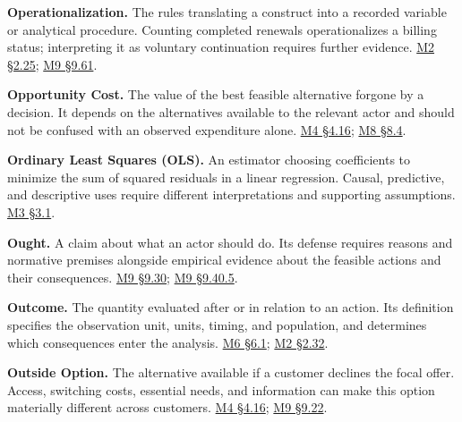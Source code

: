 \noindent\textbf{Operationalization.} The rules translating a construct into a
recorded variable or analytical procedure. Counting completed renewals
operationalizes a billing status; interpreting it as voluntary
continuation requires further evidence.
\href{Marketing_Analytics_Lecture_Notes.pdf\#M02-cancellation-requests-and-recorded-completion}{M2
§2.25};
\hyperref[M09-what-the-artifact-makes-visible]{M9
§9.61}.

\noindent\textbf{Opportunity Cost.} The value of the best feasible alternative
forgone by a decision. It depends on the alternatives available to the
relevant actor and should not be confused with an observed expenditure
alone.
\href{Marketing_Analytics_Lecture_Notes.pdf\#M04-ai-services-buyer-burden-and-the-outside-option}{M4
§4.16};
\href{Marketing_Analytics_Lecture_Notes.pdf\#M08-case-study-allocate-the-next-dollar-using-marginal-returns}{M8
§8.4}.

\noindent\textbf{Ordinary Least Squares (OLS).} An estimator choosing
coefficients to minimize the sum of squared residuals in a linear
regression. Causal, predictive, and descriptive uses require different
interpretations and supporting assumptions.
\href{Marketing_Analytics_Lecture_Notes.pdf\#M03-a-conditional-mean-and-a-regression-line}{M3
§3.1}.

\noindent\textbf{Ought.} A claim about what an actor should do. Its defense
requires reasons and normative premises alongside empirical evidence
about the feasible actions and their consequences.
\hyperref[M09-what-a-company-ought-to-do]{M9
§9.30};
\hyperref[M09-from-a-conditional-result-to-an-ought-conclusion]{M9
§9.40.5}.

\noindent\textbf{Outcome.} The quantity evaluated after or in relation to an
action. Its definition specifies the observation unit, units, timing,
and population, and determines which consequences enter the analysis.
\href{Marketing_Analytics_Lecture_Notes.pdf\#M06-define-the-treatment-outcome-and-estimand}{M6
§6.1};
\href{Marketing_Analytics_Lecture_Notes.pdf\#M02-defining-harm-before-choosing-its-measure}{M2
§2.32}.

\noindent\textbf{Outside Option.} The alternative available if a customer
declines the focal offer. Access, switching costs, essential needs, and
information can make this option materially different across customers.
\href{Marketing_Analytics_Lecture_Notes.pdf\#M04-ai-services-buyer-burden-and-the-outside-option}{M4
§4.16};
\hyperref[M09-pricing-authority-and-customer-alternatives]{M9
§9.22}.

